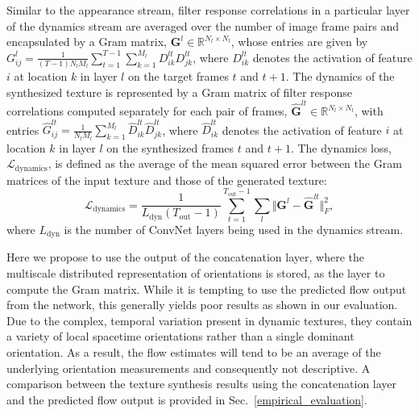 Similar to the appearance stream, filter response correlations
in a particular layer of the dynamics
stream are averaged over the number of image frame
pairs and encapsulated by a Gram matrix,
$\mathbf{G}^{l} \in \mathbb{R}^{N_l \times N_l}$,
whose entries are given by
$G_{ij}^l = \frac{1}{(T-1) N_l M_l} \sum_{t=1}^{T-1} \sum_{k=1}^{M_l} D_{ik}^{lt} D_{jk}^{lt}$,
where $D_{ik}^{lt}$ denotes the activation of feature $i$ at
location $k$ in layer $l$ on the target frames $t$ and $t+1$.
The dynamics of the synthesized texture is represented
by a Gram matrix of filter response correlations 
computed separately for each pair of frames,
$\hat{\mathbf{G}}^{lt} \in \mathbb{R}^{N_l \times N_l}$,
with entries
$\hat{G}_{ij}^{lt} = \frac{1}{N_l M_l} \sum_{k=1}^{M_l} \hat{D}_{ik}^{lt} \hat{D}_{jk}^{lt}$,
where $\hat{D}_{ik}^{lt}$ denotes the activation of feature $i$ at
location $k$ in layer $l$ on the synthesized frames $t$ and $t+1$.
The dynamics loss, $\mathcal{L}_\text{dynamics}$, is defined as
the average of the mean squared error between the Gram matrices
of the input texture
and those of the generated texture:
\begin{equation}
   \mathcal{L}_\text{dynamics} = \frac{1}{L_\text{dyn} (T_\text{out}-1)}\sum_{t=1}^{T_\text{out}-1} \sum_{l}  \Vert \mathbf{G}^l - \hat{\mathbf{G}}^{lt}\Vert^2_F, \label{eq:dynloss}
\end{equation}
where $L_\text{dyn}$ is the number of ConvNet layers being used
in the dynamics stream.

Here we propose to use the output of the concatenation layer,
where the multiscale distributed representation of orientations is
stored, as the layer to compute the Gram matrix.
While it is tempting to use the predicted flow output from the
network, this generally yields poor results as shown in our evaluation.
Due to the complex, temporal variation present in dynamic
textures, they contain a variety of local spacetime
orientations rather than a single dominant orientation.
As a result, the flow estimates will tend to be an average of the
underlying  orientation measurements and consequently not
descriptive. A comparison between the texture synthesis results using the concatenation layer and the predicted flow output is provided in Sec.\ \ref{empirical_evaluation}.

